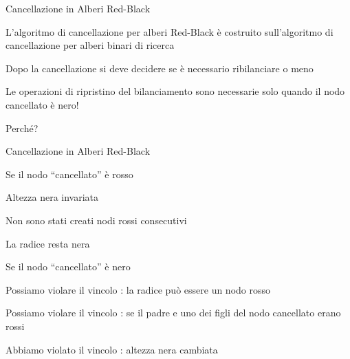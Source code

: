 \begin{frame}{Cancellazione in Alberi Red-Black}

\vspace{-9pt}
\BIL
\item L’algoritmo di cancellazione per alberi Red-Black è costruito 
sull’algoritmo di cancellazione per alberi binari di ricerca
\item Dopo la cancellazione si deve decidere se è necessario ribilanciare o meno
\item Le operazioni di ripristino del bilanciamento sono necessarie solo quando il nodo cancellato è nero! 
\item Perché?
\EIL

\end{frame}

\begin{frame}{Cancellazione in Alberi Red-Black}

\vspace{-9pt}
\BIL
\item Se il nodo “cancellato” è rosso
\BI
\item Altezza nera invariata
\item Non sono stati creati nodi rossi consecutivi
\item La radice resta nera
\EI
\item Se il nodo “cancellato” è nero
\BI
\item Possiamo violare il vincolo : la radice può essere un nodo rosso
\item Possiamo violare il vincolo : se il padre e uno dei figli del nodo cancellato erano rossi
\item Abbiamo violato il vincolo : altezza nera cambiata
\EI
\EIL
{}

\end{frame}

